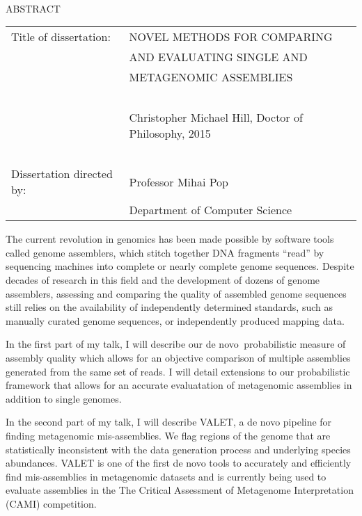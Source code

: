 
\hbox{\ }

\renewcommand{\baselinestretch}{1}
\small \normalsize

\begin{center}
\large{{ABSTRACT}}

\vspace{3em}

\end{center}
\hspace{-.15in}
\begin{tabular}{ll}
Title of dissertation:    & {\large  NOVEL METHODS FOR COMPARING}\\
&				      {\large AND EVALUATING SINGLE AND  } \\
&                     {\large METAGENOMIC ASSEMBLIES} \\
\ \\
&                          {\large  Christopher Michael Hill, Doctor of Philosophy, 2015} \\
\ \\
Dissertation directed by: & {\large  Professor Mihai Pop} \\
&  				{\large	 Department of Computer Science } \\
\end{tabular}

\vspace{3em}

\renewcommand{\baselinestretch}{2}
\large \normalsize

The current revolution in genomics has been made possible by software tools called genome assemblers, which stitch together DNA fragments ``read'' by sequencing machines into complete or nearly complete genome sequences. Despite decades of research in this field and the development of dozens of genome assemblers, assessing and comparing the quality of assembled genome sequences still relies on the availability of independently determined standards, such as manually curated genome sequences, or independently produced mapping data.

In the first part of my talk, I will describe our de novo  probabilistic measure of assembly quality which allows for an objective comparison of multiple assemblies generated from the same set of reads. I will detail extensions to our probabilistic framework that allows for an accurate evaluatation of metagenomic assemblies in addition to single genomes.

In the second part of my talk, I will describe VALET, a de novo pipeline for finding metagenomic mis-assemblies.  We flag regions of the genome that are statistically inconsistent with the data generation process and underlying species abundances. VALET is one of the first de novo tools to accurately and efficiently find mis-assemblies in metagenomic datasets and is currently being used to evaluate assemblies in the The Critical Assessment of Metagenome Interpretation (CAMI) competition.

